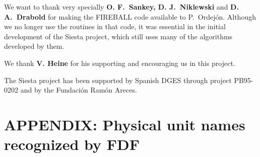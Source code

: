 \documentclass[11pt]{article}
\begin{document}
We want to thank very specially {\bf O. F.\ Sankey, D. J.\ Niklewski} and 
{\bf D. A.\ Drabold} for making the FIREBALL code available to P.\ Ordej\'on. 
Although we no longer use the routines in that code, it 
was essential in the initial development of the {\sc Siesta} project,
which still uses many of the algorithms developed by them.

We thank {\bf V. Heine} for his supporting and encouraging us in this
project. 

The {\sc Siesta} project has been supported by Spanish DGES
through project PB95-0202 and by the Fundaci\'on Ram\'on Areces.


\section{APPENDIX: Physical unit names recognized by FDF}
\end{document}
